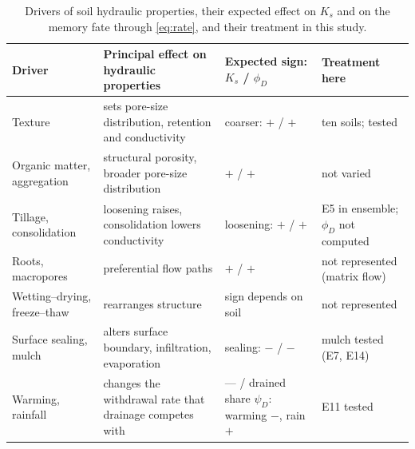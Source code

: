 \documentclass[preprint,12pt,authoryear]{elsarticle}
\begin{document}
\begin{table}[H]\centering\small
\caption{Drivers of soil hydraulic properties, their expected effect on $K_s$ and on the memory fate through \cref{eq:rate}, and their treatment in this study.}
\label{tab:drivers}
\begin{tabularx}{\textwidth}{>{\raggedright\arraybackslash}p{2.6cm}>{\raggedright\arraybackslash}X>{\raggedright\arraybackslash}p{2.3cm}>{\raggedright\arraybackslash}p{3.0cm}}
\toprule
Driver & Principal effect on hydraulic properties & Expected sign: $K_s$ / $\phi_D$ & Treatment here\\\midrule
Texture & sets pore-size distribution, retention and conductivity & coarser: $+$ / $+$ & ten soils; tested\\
Organic matter, aggregation & structural porosity, broader pore-size distribution & $+$ / $+$ & not varied\\
Tillage, consolidation & loosening raises, consolidation lowers conductivity & loosening: $+$ / $+$ & E5 in ensemble; $\phi_D$ not computed\\
Roots, macropores & preferential flow paths & $+$ / $+$ & not represented (matrix flow)\\
Wetting--drying, freeze--thaw & rearranges structure & sign depends on soil & not represented\\
Surface sealing, mulch & alters surface boundary, infiltration, evaporation & sealing: $-$ / $-$ & mulch tested (E7, E14)\\
Warming, rainfall & changes the withdrawal rate that drainage competes with & --- / drained share $\psi_D$: warming $-$, rain $+$ & E11 tested\\\bottomrule
\end{tabularx}
\end{table}
\end{document}
